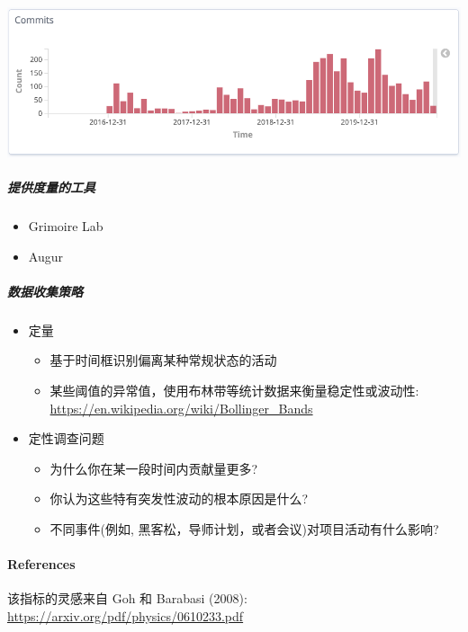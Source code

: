 \includegraphics{images/burstiness_gl.png}

\hypertarget{ux63d0ux4f9bux5ea6ux91cfux7684ux5de5ux5177}{%
\subparagraph{提供度量的工具}\label{ux63d0ux4f9bux5ea6ux91cfux7684ux5de5ux5177}}

\begin{itemize}
\tightlist
\item
  Grimoire Lab
\item
  Augur
\end{itemize}

\hypertarget{ux6570ux636eux6536ux96c6ux7b56ux7565}{%
\subparagraph{数据收集策略}\label{ux6570ux636eux6536ux96c6ux7b56ux7565}}

\begin{itemize}
\item
  定量

  \begin{itemize}
  \tightlist
  \item
    基于时间框识别偏离某种常规状态的活动
  \item
    某些阈值的异常值，使用布林带等统计数据来衡量稳定性或波动性:
    \href{https://en.wikipedia.org/wiki/Bollinger_Bands}{https://en.wikipedia.org/wiki/Bollinger\_Bands}
  \end{itemize}
\item
  定性调查问题

  \begin{itemize}
  \tightlist
  \item
    为什么你在某一段时间内贡献量更多?
  \item
    你认为这些特有突发性波动的根本原因是什么?
  \item
    不同事件(例如, 黑客松，导师计划，或者会议)对项目活动有什么影响?
  \end{itemize}
\end{itemize}

\hypertarget{references}{%
\paragraph{References}\label{references}}

该指标的灵感来自 Goh 和 Barabasi (2008):
\href{https://arxiv.org/pdf/physics/0610233.pdf}{https://arxiv.org/pdf/physics/0610233.pdf}
